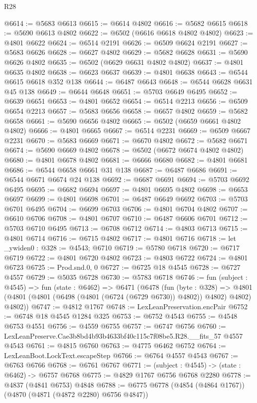 \begin{lexlean}{R28}
\begin{coremodule}
@6614 := @5683 @6613
@6615 := @6614 @4802
@6616 := @5682 @6615
@6618 := @5690 @6613 @4802
@6622 := @6502 (@6616 @6618 @4802 @4802)
@6623 := @4801 @6622
@6624 := @6514 @2191
@6626 := @6509 @6624 @2191
@6627 := @5683 @6626
@6628 := @6627 @4802
@6629 := @5682 @6628
@6631 := @5690 @6626 @4802
@6635 := @6502 (@6629 @6631 @4802 @4802)
@6637 := @4801 @6635 @4802
@6638 := @6623 @6637
@6639 := @4801 @6638
@6643 := @6544 @6615 @6618 @352 @138
@6644 := @6487 @6643
@6648 := @6544 @6628 @6631 @45 @138
@6649 := @6644 @6648
@6651 := @5703 @6649 @6495
@6652 := @6639 @6651
@6653 := @4801 @6652
@6654 := @6514 @2213
@6656 := @6509 @6654 @2213
@6657 := @5683 @6656
@6658 := @6657 @4802
@6659 := @5682 @6658
@6661 := @5690 @6656 @4802
@6665 := @6502 (@6659 @6661 @4802 @4802)
@6666 := @4801 @6665
@6667 := @6514 @2231
@6669 := @6509 @6667 @2231
@6670 := @5683 @6669
@6671 := @6670 @4802
@6672 := @5682 @6671
@6674 := @5690 @6669 @4802
@6678 := @6502 (@6672 @6674 @4802 @4802)
@6680 := @4801 @6678 @4802
@6681 := @6666 @6680
@6682 := @4801 @6681
@6686 := @6544 @6658 @6661 @31 @138
@6687 := @6487 @6686
@6691 := @6544 @6671 @6674 @24 @138
@6692 := @6687 @6691
@6694 := @5703 @6692 @6495
@6695 := @6682 @6694
@6697 := @4801 @6695 @4802
@6698 := @6653 @6697
@6699 := @4801 @6698
@6701 := @6487 @6649 @6692
@6703 := @5703 @6701 @6495
@6704 := @6699 @6703
@6706 := @4801 @6704 @4802
@6707 := @6610 @6706
@6708 := @4801 @6707
@6710 := @6487 @6606 @6701
@6712 := @5703 @6710 @6495
@6713 := @6708 @6712
@6714 := @4803 @6713
@6715 := @4801 @6714
@6716 := @6715 @4802
@6717 := @4801 @6716
@6718 := let _ywiden0 : @328 := @4543; @6710
@6719 := @5780 @6718
@6720 := @6717 @6719
@6722 := @4801 @6720 @4802
@6723 := @4803 @6722
@6724 := @4801 @6723
@6725 := Prod.snd.{0, 0}
@6727 := @6725 @18 @4545
@6728 := @6727 @4557
@6729 := @5035 @6728
@6730 := @5783 @6718
@6746 := fun (subject : @4545) =>
  fun (state : @6462) =>
  @6471
    (@6478
      (fun (byte : @328) =>
      @4801 (@4801 (@4801 (@6498 (@4801 (@6724 (@6729 @6730)) @4802)) @4802) @4802) @4802))
@6747 := @4812 @1767
@6748 := LexLeanPreservation.encPair
@6752 := @6748 @18 @4545 @1284 @325
@6753 := @6752 @4543
@6755 := @4548 @6753 @4551
@6756 := @4559 @6755
@6757 := @6747 @6756
@6760 := LexLeanPreserve.Cae3b8bd4b93b4633bf40c115c7f08be5.R28.__fits_57 @4557 @4543
@6761 := @4815 @6760
@6763 := @4775 @6462 @6752
@6764 := LexLeanBoot.LockText.escapeStep
@6766 := @6764 @4557 @4543
@6767 := @6763 @6766
@6768 := @6761 @6767
@6771 := (subject : @4545) -> (state : @6462) -> @6757 @6768
@6775 := @4829 @1767 @6756 @6768 @2280
@6778 := @4837 (@4841 @6753) @4848
@6788 := @6775 @6778 (@4854 (@4864 @1767)) (@4870 (@4871 (@4872 @2280) @6756 @4847))

\end{coremodule}
\end{lexlean}
